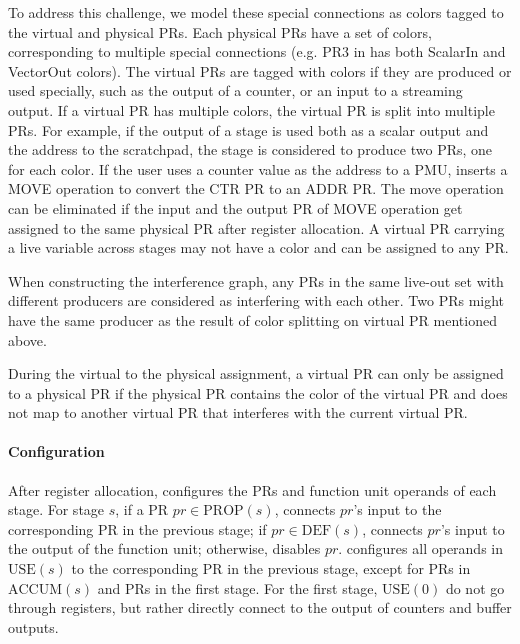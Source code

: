 To address this challenge, we model these special connections as colors tagged to the virtual and
physical PRs.
Each physical PRs have a set of colors, corresponding to multiple special connections (e.g. 
PR3 in  has both ScalarIn and VectorOut colors).
The virtual PRs are tagged with colors if they are produced or used specially, such as the output of
a counter, or an input to a streaming output.
If a virtual PR has multiple colors, the virtual PR is split into multiple PRs. 
For example, if the output of a stage is used both as a scalar output and the address to the scratchpad, the stage is considered to produce two PRs, one for each color.
If the user uses a counter value as the address to a PMU, \name inserts a MOVE operation
to convert the CTR PR to an ADDR PR. The move operation can be eliminated if the input and the
output PR of MOVE operation get assigned to the same physical PR after register allocation.
A virtual PR carrying a live variable across stages may not have a color and can be assigned to any
PR.

When constructing the interference graph, any PRs in the same live-out set with different producers are
considered as interfering with each other. Two PRs might have the same producer as the result of
color splitting on virtual PR mentioned above.

During the virtual to the physical assignment, a virtual PR can only be assigned to a physical PR if the physical PR contains
the color of the virtual PR and does not map to another virtual PR that interferes with the current
virtual PR.

\paragraph{Configuration}
After register allocation, \name configures the PRs and function unit operands of each stage. 
For stage $s$, if a PR $pr \in \text{PROP}(s)$, \name connects $pr$'s input to the corresponding PR in
the previous stage; 
if $pr \in \text{DEF}(s)$, \name connects $pr$'s input to the output of the function unit; 
otherwise, \name disables $pr$.
\name configures all operands in $\text{USE}(s)$ to the corresponding PR in the previous stage,
except for PRs in $\text{ACCUM}(s)$ and PRs in the first stage.
For the first stage, $\text{USE}(0)$ do not go through registers, but rather directly connect to
the output of counters and buffer outputs.

